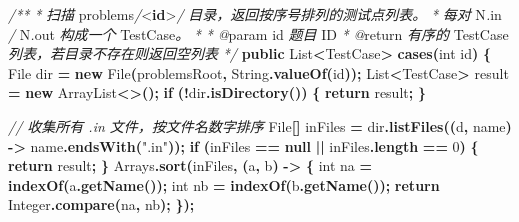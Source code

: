 \documentclass[
  11pt,
]{ctexart}
\newenvironment{Shaded}{\begin{snugshade}}{\end{snugshade}}
\newcommand{\BuiltInTok}[1]{#1}
\newcommand{\CommentTok}[1]{\textcolor[rgb]{0.56,0.35,0.01}{\textit{#1}}}
\newcommand{\ControlFlowTok}[1]{\textcolor[rgb]{0.13,0.29,0.53}{\textbf{#1}}}
\newcommand{\DataTypeTok}[1]{\textcolor[rgb]{0.13,0.29,0.53}{#1}}
\newcommand{\DecValTok}[1]{\textcolor[rgb]{0.00,0.00,0.81}{#1}}
\newcommand{\FunctionTok}[1]{\textcolor[rgb]{0.13,0.29,0.53}{\textbf{#1}}}
\newcommand{\KeywordTok}[1]{\textcolor[rgb]{0.13,0.29,0.53}{\textbf{#1}}}
\newcommand{\NormalTok}[1]{#1}
\newcommand{\OperatorTok}[1]{\textcolor[rgb]{0.81,0.36,0.00}{\textbf{#1}}}
\newcommand{\StringTok}[1]{\textcolor[rgb]{0.31,0.60,0.02}{#1}}
\begin{document}
\begin{Shaded}
\begin{Highlighting}[]
    \CommentTok{/**}
     \CommentTok{*} \CommentTok{扫描}\NormalTok{ problems}\CommentTok{/}\DataTypeTok{\textless{}}\KeywordTok{id}\DataTypeTok{\textgreater{}}\CommentTok{/} \CommentTok{目录，返回按序号排列的测试点列表。}
     \CommentTok{*} \CommentTok{每对}\NormalTok{ N}\CommentTok{.}\NormalTok{in }\CommentTok{/}\NormalTok{ N}\CommentTok{.}\NormalTok{out }\CommentTok{构成一个}\NormalTok{ TestCase}\CommentTok{。}
     \CommentTok{*}
\CommentTok{     * @}\NormalTok{param id }\CommentTok{题目}\NormalTok{ ID}
     \CommentTok{*} \CommentTok{@}\NormalTok{return }\CommentTok{有序的}\NormalTok{ TestCase }\CommentTok{列表，若目录不存在则返回空列表}
     \CommentTok{*/}
    \KeywordTok{public} \BuiltInTok{List}\OperatorTok{\textless{}}\NormalTok{TestCase}\OperatorTok{\textgreater{}} \FunctionTok{cases}\OperatorTok{(}\DataTypeTok{int}\NormalTok{ id}\OperatorTok{)} \OperatorTok{\{}
        \BuiltInTok{File}\NormalTok{ dir }\OperatorTok{=} \KeywordTok{new} \BuiltInTok{File}\OperatorTok{(}\NormalTok{problemsRoot}\OperatorTok{,} \BuiltInTok{String}\OperatorTok{.}\FunctionTok{valueOf}\OperatorTok{(}\NormalTok{id}\OperatorTok{));}
        \BuiltInTok{List}\OperatorTok{\textless{}}\NormalTok{TestCase}\OperatorTok{\textgreater{}}\NormalTok{ result }\OperatorTok{=} \KeywordTok{new} \BuiltInTok{ArrayList}\OperatorTok{\textless{}\textgreater{}();}
        \ControlFlowTok{if} \OperatorTok{(!}\NormalTok{dir}\OperatorTok{.}\FunctionTok{isDirectory}\OperatorTok{())} \OperatorTok{\{}
            \ControlFlowTok{return}\NormalTok{ result}\OperatorTok{;}
        \OperatorTok{\}}

        \CommentTok{// 收集所有 .in 文件，按文件名数字排序}
        \BuiltInTok{File}\OperatorTok{[]}\NormalTok{ inFiles }\OperatorTok{=}\NormalTok{ dir}\OperatorTok{.}\FunctionTok{listFiles}\OperatorTok{((}\NormalTok{d}\OperatorTok{,}\NormalTok{ name}\OperatorTok{)} \OperatorTok{{-}\textgreater{}}\NormalTok{ name}\OperatorTok{.}\FunctionTok{endsWith}\OperatorTok{(}\StringTok{".in"}\OperatorTok{));}
        \ControlFlowTok{if} \OperatorTok{(}\NormalTok{inFiles }\OperatorTok{==} \KeywordTok{null} \OperatorTok{||}\NormalTok{ inFiles}\OperatorTok{.}\FunctionTok{length} \OperatorTok{==} \DecValTok{0}\OperatorTok{)} \OperatorTok{\{}
            \ControlFlowTok{return}\NormalTok{ result}\OperatorTok{;}
        \OperatorTok{\}}
        \BuiltInTok{Arrays}\OperatorTok{.}\FunctionTok{sort}\OperatorTok{(}\NormalTok{inFiles}\OperatorTok{,} \OperatorTok{(}\NormalTok{a}\OperatorTok{,}\NormalTok{ b}\OperatorTok{)} \OperatorTok{{-}\textgreater{}} \OperatorTok{\{}
            \DataTypeTok{int}\NormalTok{ na }\OperatorTok{=} \FunctionTok{indexOf}\OperatorTok{(}\NormalTok{a}\OperatorTok{.}\FunctionTok{getName}\OperatorTok{());}
            \DataTypeTok{int}\NormalTok{ nb }\OperatorTok{=} \FunctionTok{indexOf}\OperatorTok{(}\NormalTok{b}\OperatorTok{.}\FunctionTok{getName}\OperatorTok{());}
            \ControlFlowTok{return} \BuiltInTok{Integer}\OperatorTok{.}\FunctionTok{compare}\OperatorTok{(}\NormalTok{na}\OperatorTok{,}\NormalTok{ nb}\OperatorTok{);}
        \OperatorTok{\});}


\end{Highlighting}
\end{Shaded}
\end{document}
